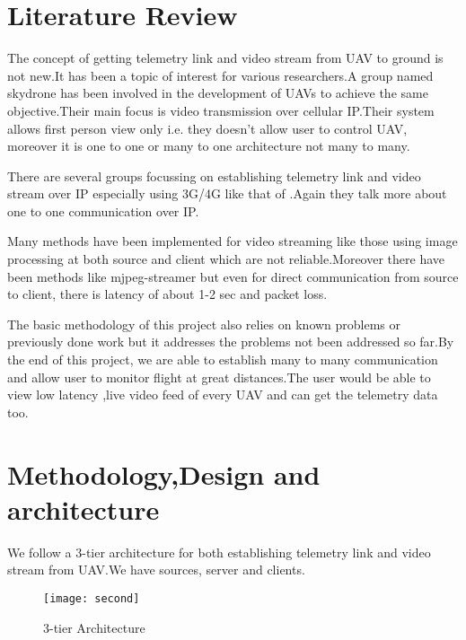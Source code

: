 \documentclass[12pt]{article}
\begin{document}
\section{Literature Review}
The concept of getting telemetry link and video stream from UAV to ground is not new.It has been a topic of interest for various researchers.\newline A group named skydrone \cite{5} has been involved in the development of UAVs to achieve the same objective.Their main focus is video transmission over cellular IP.Their system allows first person view only i.e. they doesn't allow user to control UAV, moreover it is one to one or many to one architecture not many to many.\newline\par
There are several groups focussing on establishing telemetry link and video stream over IP especially using 3G/4G like that of \cite{6}.Again they talk more about one to one communication over IP.\newline\par
Many methods have been implemented for video streaming like those using image processing at both source and client which are not reliable.Moreover there have been methods like mjpeg-streamer but even for direct communication from source to client, there is latency of about 1-2 sec and packet loss. \newline\newline\par
The basic methodology of this project also relies on known problems or previously done work but it addresses the problems not been addressed so far.By the end of this project, we are able to establish many to many communication and allow user to monitor flight at great distances.The user would be able to view low latency ,live video feed of every UAV and can get the telemetry data too.
\section{Methodology,Design and architecture}
We follow a 3-tier architecture for both establishing telemetry link and video stream from UAV.We have sources, server and clients.
\vspace*{10px}
\begin{figure}[ht!]
\centering
\texttt{[image: second]}
\caption{3-tier Architecture}
\label{overflow}
\end{figure}

\vspace*{50px}
\end{document}
